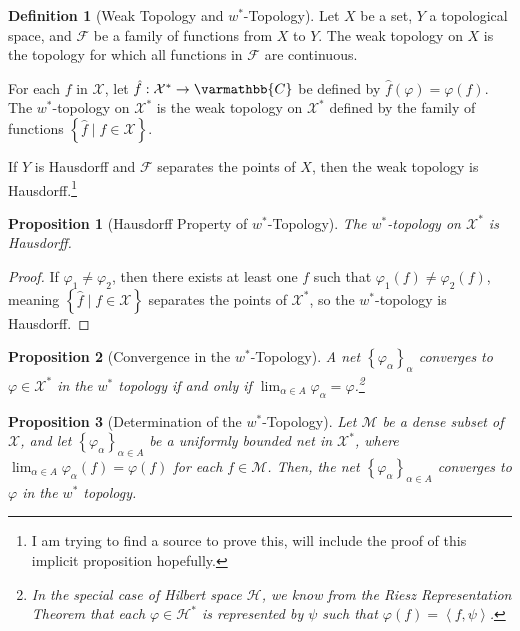 \documentclass[12pt]{extarticle}
\newcommand{\C}{\mathbb{C}}
\newcommand{\iprod}[2]{\left\langle #1,#2\right\rangle}
\newcommand{\set}[1]{\left\{#1\right\}}
\theoremstyle{plain}
\newtheorem*{proposition}{Proposition}
\theoremstyle{definition}
\newtheorem*{definition}{Definition}
\theoremstyle{note}
\renewcommand*{\mathbb}[1]{\varmathbb{#1}}
\renewcommand{\newline}{\hfill\break}
\begin{document}
\begin{definition}[Weak Topology and $w^{\ast}$-Topology]
Let $X$ be a set, $Y$ a topological space, and $\mathcal{F}$ be a family of functions from $X$ to $Y$. The weak topology on $X$ is the topology for which all functions in $\mathcal{F}$ are continuous.\newline

For each $f$ in $\mathcal{X}$, let $\hat{f}: \mathcal{X}^{\ast}\rightarrow \C$ be defined by $\hat{f}(\varphi) = \varphi(f)$. The $w^{\ast}$-topology on $\mathcal{X}^{\ast}$ is the weak topology on $\mathcal{X}^{\ast}$ defined by the family of functions $\set{\hat{f}\mid f\in \mathcal{X}}$.\newline

If $Y$ is Hausdorff and $\mathcal{F}$ separates the points of $X$, then the weak topology is Hausdorff.\footnote{I am trying to find a source to prove this, will include the proof of this implicit proposition hopefully.}
\end{definition}
\begin{proposition}[Hausdorff Property of $w^{\ast}$-Topology]
  The $w^{\ast}$-topology on $\mathcal{X}^{\ast}$ is Hausdorff.
\end{proposition}
\begin{proof}
  If $\varphi_1 \neq \varphi_2$, then there exists at least one $f$ such that $\varphi_1(f) \neq \varphi_2(f)$, meaning $\set{\hat{f}\mid f\in \mathcal{X}}$ separates the points of $\mathcal{X}^{\ast}$, so the $w^{\ast}$-topology is Hausdorff.
\end{proof}
\begin{proposition}[Convergence in the $w^{\ast}$-Topology]
  A net $\set{\varphi_{\alpha}}_{\alpha}$ converges to $\varphi\in\mathcal{X}^{\ast}$ in the $w^{\ast}$ topology if and only if $\lim_{\alpha \in A}\varphi_{\alpha} = \varphi$.\footnote{In the special case of Hilbert space $\mathcal{H}$, we know from the Riesz Representation Theorem that each $\varphi\in \mathcal{H}^{\ast}$ is represented by $\psi$ such that $\varphi(f) = \iprod{f}{\psi}$.}
\end{proposition}
\begin{proposition}[Determination of the $w^{\ast}$-Topology]
  Let $\mathcal{M}$ be a dense subset of $\mathcal{X}$, and let $\set{\varphi_{\alpha}}_{\alpha\in A}$ be a uniformly bounded net in $\mathcal{X}^{\ast}$, where $\lim_{\alpha \in A}\varphi_{\alpha}(f) = \varphi(f)$ for each $f\in \mathcal{M}$. Then, the net $\set{\varphi_{\alpha}}_{\alpha \in A}$ converges to $\varphi$ in the $w^{\ast}$ topology.
\end{proposition}
\end{document}
